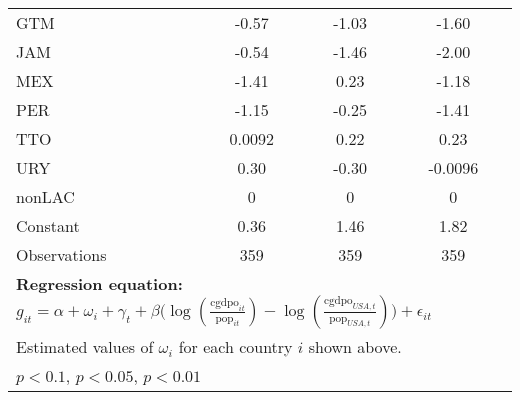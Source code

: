 \begin{table}[htbp]
\begin{tabular}{l*{3}{c}}
GTM             &    -0.57\sym{***}&    -1.03\sym{***}&    -1.60\sym{***}\\
JAM             &    -0.54\sym{***}&    -1.46\sym{***}&    -2.00\sym{***}\\
MEX             &    -1.41\sym{***}&     0.23         &    -1.18\sym{***}\\
PER             &    -1.15\sym{***}&    -0.25         &    -1.41\sym{***}\\
TTO             &   0.0092         &     0.22         &     0.23         \\
URY             &     0.30\sym{***}&    -0.30\sym{*}  &  -0.0096         \\
nonLAC          &        0         &        0         &        0         \\
Constant        &     0.36\sym{*}  &     1.46\sym{***}&     1.82\sym{***}\\
\midrule
Observations    &      359         &      359         &      359         \\
\bottomrule
\multicolumn{4}{l}{\footnotesize \textbf{Regression equation:} \(g_{it} = \alpha  + \omega_i + \gamma_t + \beta \big(\log (\frac{\textrm{cgdpo}_{it}}{\textrm{pop}_{it}} ) - \log (\frac{\textrm{cgdpo}_{USA,t}}{\textrm{pop}_{USA,t}}  ) \big) + \epsilon_{it}\)}\\
\multicolumn{4}{l}{\footnotesize Estimated values of \(\omega_i\) for each country \(i\) shown above.}\\
\multicolumn{4}{l}{\footnotesize \sym{*} \(p<0.1\), \sym{**} \(p<0.05\), \sym{***} \(p<0.01\)}\\
\end{tabular}
\end{table}
